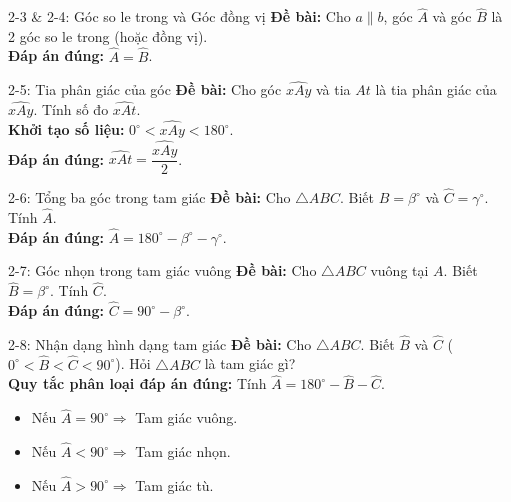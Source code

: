 \documentclass[11pt, a4paper]{article}
\begin{document}
\begin{qbox}{2-3 \& 2-4: Góc so le trong và Góc đồng vị}
\textbf{Đề bài:} Cho $a \parallel b$, góc $\widehat{A}$ và góc $\widehat{B}$ là 2 góc so le trong (hoặc đồng vị). \\[0.3em]
\textbf{Đáp án đúng:} $\widehat{A} = \widehat{B}$.
\end{qbox}

\begin{qbox}{2-5: Tia phân giác của góc}
\textbf{Đề bài:} Cho góc $\widehat{xAy}$ và tia $At$ là tia phân giác của $\widehat{xAy}$. Tính số đo $\widehat{xAt}$. \\[0.3em]
\textbf{Khởi tạo số liệu:} $0^\circ < \widehat{xAy} < 180^\circ$. \\[0.3em]
\textbf{Đáp án đúng:} $\widehat{xAt} = \dfrac{\widehat{xAy}}{2}$.
\end{qbox}

\begin{qbox}{2-6: Tổng ba góc trong tam giác}
\textbf{Đề bài:} Cho $\triangle ABC$. Biết $\widehat{B} = \beta^\circ$ và $\widehat{C} = \gamma^\circ$. Tính $\widehat{A}$. \\[0.3em]
\textbf{Đáp án đúng:} $\widehat{A} = 180^\circ - \beta^\circ - \gamma^\circ$.
\end{qbox}

\begin{qbox}{2-7: Góc nhọn trong tam giác vuông}
\textbf{Đề bài:} Cho $\triangle ABC$ vuông tại $A$. Biết $\widehat{B} = \beta^\circ$. Tính $\widehat{C}$. \\[0.3em]
\textbf{Đáp án đúng:} $\widehat{C} = 90^\circ - \beta^\circ$.
\end{qbox}

\begin{qbox}{2-8: Nhận dạng hình dạng tam giác}
\textbf{Đề bài:} Cho $\triangle ABC$. Biết $\widehat{B}$ và $\widehat{C}$ ($0^\circ < \widehat{B} < \widehat{C} < 90^\circ$). Hỏi $\triangle ABC$ là tam giác gì? \\[0.3em]
\textbf{Quy tắc phân loại đáp án đúng:} Tính $\widehat{A} = 180^\circ - \widehat{B} - \widehat{C}$.
\begin{itemize}[leftmargin=1.5em, topsep=2pt, itemsep=2pt]
    \item Nếu $\widehat{A} = 90^\circ \Rightarrow$ Tam giác vuông.
    \item Nếu $\widehat{A} < 90^\circ \Rightarrow$ Tam giác nhọn.
    \item Nếu $\widehat{A} > 90^\circ \Rightarrow$ Tam giác tù.
\end{itemize}
\end{qbox}
\end{document}
